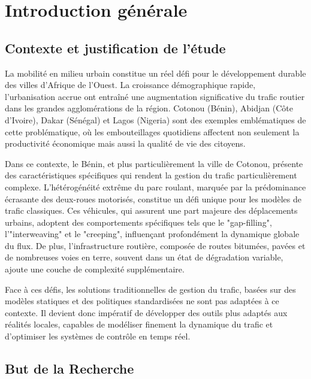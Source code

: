 \chapter*{Introduction générale}
\label{chap:intro}

\section{Contexte et justification de l'étude}
\label{sec:contexte_justification}

La mobilité en milieu urbain constitue un réel défi pour le développement durable des villes d'Afrique de l'Ouest. La croissance démographique rapide, l'urbanisation accrue ont entraîné une augmentation significative du trafic routier dans les grandes agglomérations de la région. Cotonou (Bénin), Abidjan (Côte d'Ivoire), Dakar (Sénégal) et Lagos (Nigeria) sont des exemples emblématiques de cette problématique, où les embouteillages quotidiens affectent non seulement la productivité économique mais aussi la qualité de vie des citoyens.

Dans ce contexte, le Bénin, et plus particulièrement la ville de Cotonou, présente des caractéristiques spécifiques qui rendent la gestion du trafic particulièrement complexe. L'hétérogénéité extrême du parc roulant, marquée par la prédominance écrasante des deux-roues motorisés, constitue un défi unique pour les modèles de trafic classiques. Ces véhicules, qui assurent une part majeure des déplacements urbains, adoptent des comportements spécifiques tels que le "gap-filling", l'"interweaving" et le "creeping", influençant profondément la dynamique globale du flux. De plus, l'infrastructure routière, composée de routes bitumées, pavées et de nombreuses voies en terre, souvent dans un état de dégradation variable, ajoute une couche de complexité supplémentaire.

Face à ces défis, les solutions traditionnelles de gestion du trafic, basées sur des modèles statiques et des politiques standardisées ne sont pas adaptées à ce contexte. Il devient donc impératif de développer des outils plus adaptés aux réalités locales, capables de modéliser finement la dynamique du trafic et d'optimiser les systèmes de contrôle en temps réel.

\section{But de la Recherche}
\label{sec:but_recherche}

